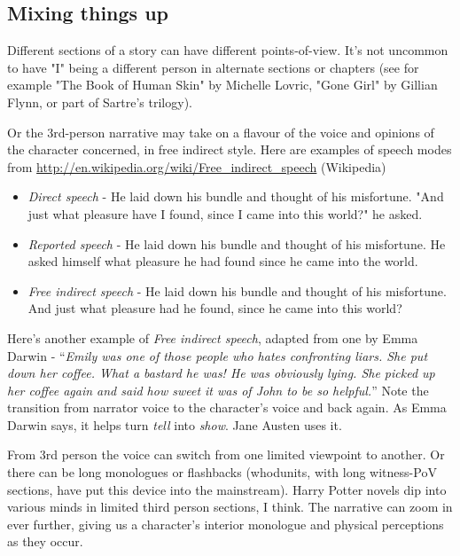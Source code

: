 \documentclass[11pt]{article}
\begin{document}
\subsection*{Mixing things up}
Different sections of a story can have different points-of-view. It's not uncommon to have "I" being a different person in alternate sections or chapters (see for example "The Book of Human Skin" by Michelle Lovric, "Gone Girl" by Gillian Flynn, or part of Sartre's trilogy).


 Or the 3rd-person narrative may take on a flavour of the voice and opinions of the character concerned, in free indirect style. Here are examples of speech modes from \url{http://en.wikipedia.org/wiki/Free_indirect_speech} (Wikipedia)


\begin{itemize}
\item \textit{Direct speech} - He laid down his bundle and thought of his misfortune. "And just what pleasure have I found, since I came into this world?" he asked.
\item \textit{Reported speech} - He laid down his bundle and thought of his misfortune. He asked himself what pleasure he had found since he came into the world.
\item \textit{Free indirect speech} - He laid down his bundle and thought of his misfortune. And just what pleasure had he found, since he came into this world?
\end{itemize}
Here's another example of \textit{Free indirect speech}, adapted from one by Emma Darwin -  
``\textit{Emily was one of those people who hates confronting liars. She put down her coffee. What a bastard he was! He was obviously lying. She picked up her coffee again and said how sweet it was of John to be so helpful.}'' 
Note the transition from narrator voice to the character's voice and back again. As Emma Darwin says, it helps turn \textit{tell} into \textit{show}. Jane Austen uses it.



From 3rd person the voice can switch from one limited viewpoint to another. Or there can be long monologues or flashbacks (whodunits, with long witness-PoV sections, have put this device into the mainstream). Harry Potter novels dip into various minds in limited third person sections, I think. The narrative can zoom in ever further, giving us a character's interior monologue and physical perceptions as they occur. 
\end{document}
